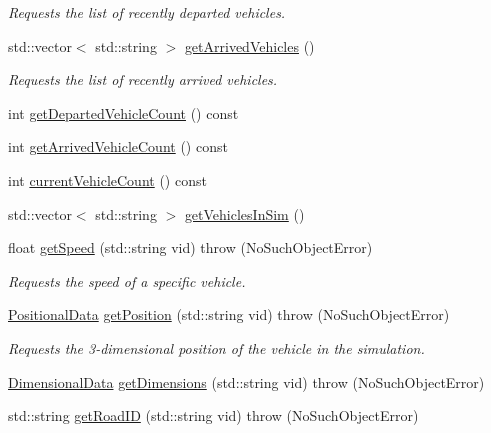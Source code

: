 \begin{DoxyCompactItemize}
\begin{DoxyCompactList}\small\item\em Requests the list of recently departed vehicles. \end{DoxyCompactList}\item 
std\+::vector$<$ std\+::string $>$ \hyperlink{classtraci__api_1_1_vehicle_manager_a5ae11ca161f1e9635142a1cdd40417ca}{get\+Arrived\+Vehicles} ()
\begin{DoxyCompactList}\small\item\em Requests the list of recently arrived vehicles. \end{DoxyCompactList}\item 
int \hyperlink{classtraci__api_1_1_vehicle_manager_a707b94f1d1f82a35263ae130a0573f77}{get\+Departed\+Vehicle\+Count} () const
\item 
int \hyperlink{classtraci__api_1_1_vehicle_manager_a193c8fa0b8778c496b23fc114653ebfa}{get\+Arrived\+Vehicle\+Count} () const
\item 
int \hyperlink{classtraci__api_1_1_vehicle_manager_a97816bd56b6f2e6949d175de86c712d6}{current\+Vehicle\+Count} () const
\item 
std\+::vector$<$ std\+::string $>$ \hyperlink{classtraci__api_1_1_vehicle_manager_ae70d2421d4a96ab7601dabb6fcc512b2}{get\+Vehicles\+In\+Sim} ()
\item 
float \hyperlink{classtraci__api_1_1_vehicle_manager_aa5f5a8c13bdd6b1407da5b5ffb6a8559}{get\+Speed} (std\+::string vid)  throw (\+No\+Such\+Object\+Error)
\begin{DoxyCompactList}\small\item\em Requests the speed of a specific vehicle. \end{DoxyCompactList}\item 
\hyperlink{class_positional_data}{Positional\+Data} \hyperlink{classtraci__api_1_1_vehicle_manager_ad00a8d49736c7806f0d363d641b7f467}{get\+Position} (std\+::string vid)  throw (\+No\+Such\+Object\+Error)
\begin{DoxyCompactList}\small\item\em Requests the 3-\/dimensional position of the vehicle in the simulation. \end{DoxyCompactList}\item 
\hyperlink{class_dimensional_data}{Dimensional\+Data} \hyperlink{classtraci__api_1_1_vehicle_manager_a626f8aea7366479ec9bdd49f58f5b530}{get\+Dimensions} (std\+::string vid)  throw (\+No\+Such\+Object\+Error)
\item 
std\+::string \hyperlink{classtraci__api_1_1_vehicle_manager_a3cbdffab3f5fd337a6de08a14b87803e}{get\+Road\+ID} (std\+::string vid)  throw (\+No\+Such\+Object\+Error)

\end{DoxyCompactItemize}
